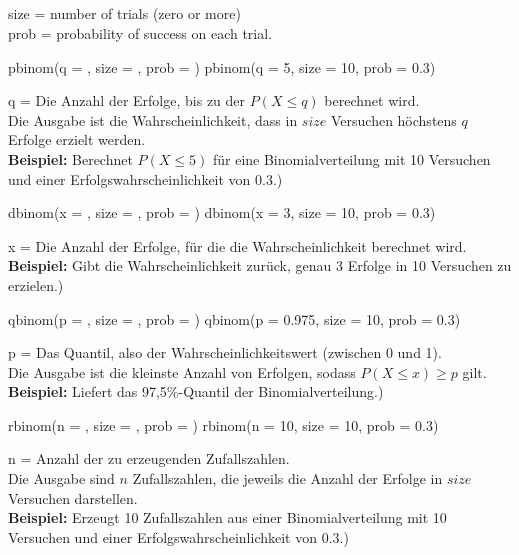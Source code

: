 \subsection{}
size = number of trials (zero or more)
\\prob = probability of success on each trial.
\begin{rcode}{1}
pbinom(q = , size = , prob = )
pbinom(q = 5, size = 10, prob = 0.3)
\end{rcode}
q = Die Anzahl der Erfolge, bis zu der \(P(X \le q)\) berechnet wird.\\
Die Ausgabe ist die Wahrscheinlichkeit, dass in \(size\) Versuchen höchstens \(q\) Erfolge erzielt werden.\\
\textbf{Beispiel:} Berechnet \(P(X \le 5)\) für eine Binomialverteilung mit 10 Versuchen und einer Erfolgswahrscheinlichkeit von 0.3.)
\begin{rcode}{1}
dbinom(x = , size = , prob = )
dbinom(x = 3, size = 10, prob = 0.3)
\end{rcode}
x = Die Anzahl der Erfolge, für die die Wahrscheinlichkeit berechnet wird.\\
\textbf{Beispiel:} Gibt die Wahrscheinlichkeit zurück, genau 3 Erfolge in 10 Versuchen zu erzielen.)
\begin{rcode}{1}
qbinom(p = , size = , prob = )
qbinom(p = 0.975, size = 10, prob = 0.3)
\end{rcode}
p = Das Quantil, also der Wahrscheinlichkeitswert (zwischen 0 und 1).\\
Die Ausgabe ist die kleinste Anzahl von Erfolgen, sodass \(P(X \le x) \ge p\) gilt.\\
\textbf{Beispiel:} Liefert das 97,5\%-Quantil der Binomialverteilung.)
\begin{rcode}{1}
rbinom(n = , size = , prob = )
rbinom(n = 10, size = 10, prob = 0.3)
\end{rcode}
n = Anzahl der zu erzeugenden Zufallszahlen.\\
Die Ausgabe sind \(n\) Zufallszahlen, die jeweils die Anzahl der Erfolge in \(size\) Versuchen darstellen.\\
\textbf{Beispiel:} Erzeugt 10 Zufallszahlen aus einer Binomialverteilung mit 10 Versuchen und einer Erfolgswahrscheinlichkeit von 0.3.)
\newpage
